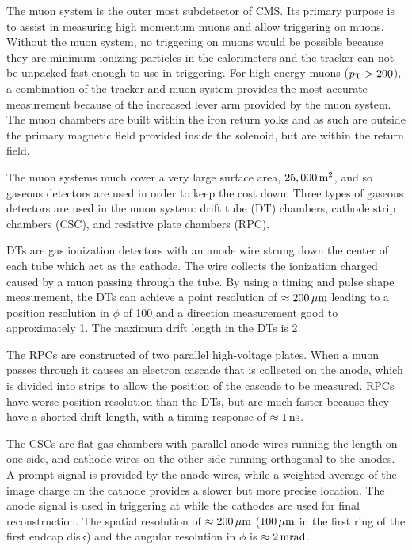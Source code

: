 The muon system is the outer most subdetector of CMS. Its primary purpose is
to assist in measuring high momentum muons and allow triggering on muons.
Without the muon system, no triggering on muons would be possible because they
are minimum ionizing particles in the calorimeters and the tracker can not be
unpacked fast enough to use in triggering. For high energy muons ($p_{\mathrm{T}} > 200$),
a combination of the tracker and muon system provides the most accurate
measurement because of the increased lever arm provided by the muon system. The
muon chambers are built within the iron return yolks and as such are outside
the primary magnetic field provided inside the solenoid, but are within the
return field.

The muon systems much cover a very large surface area, $25,000\text{\,m}^{2}$, and
so gaseous detectors are used in order to keep the cost down. Three types of
gaseous detectors are used in the muon system: drift tube (DT) chambers,
cathode strip chambers (CSC), and resistive plate chambers (RPC).

DTs are gas ionization detectors with an anode wire strung down the center of
each tube which act as the cathode. The wire collects the ionization charged
caused by a muon passing through the tube. By using a timing and pulse shape
measurement, the DTs can achieve a point resolution of $\approx
200\text{\,$\mu$m}$ leading to a position resolution in $\phi$ of 100\micrometers
and a direction measurement good to approximately 1\millirads. The maximum
drift length in the DTs is 2\centimeters.

The RPCs are constructed of two parallel high-voltage plates. When a muon
passes through it causes an electron cascade that is collected on the anode,
which is divided into strips to allow the position of the cascade to be
measured. RPCs have worse position resolution than the DTs, but are much
faster because they have a shorted drift length, with a timing response of
$\approx 1\text{\,ns}$.

The CSCs are flat gas chambers with parallel anode wires running the length on
one side, and cathode wires on the other side running orthogonal to the anodes.
A prompt signal is provided by the anode wires, while a weighted average of the
image charge on the cathode provides a slower but more precise location. The
anode signal is used in triggering at \Lone while the cathodes are used for
final reconstruction. The spatial resolution of $\approx 200\text{\,$\mu$m}$
($100\text{\,$\mu$m}$ in the first ring of the first endcap disk) and the angular
resolution in $\phi$ is $\approx 2\text{\,mrad}$.

